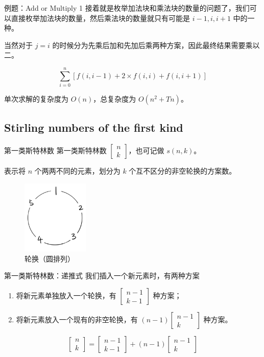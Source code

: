 \documentclass[12pt,aspectratio=169]{beamer}
\begin{document}
\begin{frame}[fragile]{例题：Add or Multiply 1}
  接着就是枚举加法块和乘法块的数量的问题了，我们可以直接枚举加法块的数量，然后乘法块的数量就只有可能是 $i-1, i, i+1$ 中的一种。

  当然对于 $j=i$ 的时候分为先乘后加和先加后乘两种方案，因此最终结果需要乘以二。

  $$
  \sum_{i=0}^{n} [f(i, i-1) + 2 \times f(i, i) + f(i, i+1)]
  $$

  单次求解的复杂度为 $O(n)$，总复杂度为 $O(n^2+Tn)$。
\end{frame}

\subsection[第一类斯特林数]{Stirling numbers of the first kind}

\begin{frame}[fragile]{第一类斯特林数}
第一类斯特林数 $\begin{bmatrix}n\\ k\end{bmatrix}$，也可记做 $s(n, k)$。

表示将 $n$ 个两两不同的元素，划分为 $k$ 个互不区分的非空轮换的方案数。

\begin{figure}
  \centering
  \includegraphics[height=100pt]{circle.png}
  \caption{轮换（圆排列）}
\end{figure}
\end{frame}

\begin{frame}[fragile]{第一类斯特林数：递推式}
我们插入一个新元素时，有两种方案

\begin{enumerate}
  \item 将新元素单独放入一个轮换，有 $\begin{bmatrix}n-1\\ k-1\end{bmatrix}$ 种方案；
  \item 将新元素放入一个现有的非空轮换，有 $(n-1)\begin{bmatrix}n-1\\ k\end{bmatrix}$ 种方案。
\end{enumerate}

$$
\begin{bmatrix}n\\ k\end{bmatrix} = \begin{bmatrix}n-1\\ k-1\end{bmatrix} + (n-1)\begin{bmatrix}n-1\\ k\end{bmatrix}
$$
\end{frame}
\end{document}
